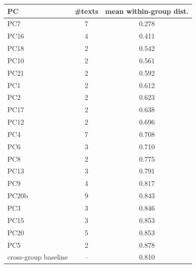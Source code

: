 \begin{tabular}{lcc}
\toprule
PC & \#texts & mean within-group dist. \\
\midrule
PC7 & 7 & 0.278 \\
PC16 & 4 & 0.411 \\
PC18 & 2 & 0.542 \\
PC10 & 2 & 0.561 \\
PC21 & 2 & 0.592 \\
PC1 & 2 & 0.612 \\
PC2 & 2 & 0.623 \\
PC17 & 2 & 0.638 \\
PC12 & 2 & 0.696 \\
PC4 & 7 & 0.708 \\
PC6 & 3 & 0.710 \\
PC8 & 2 & 0.775 \\
PC13 & 3 & 0.791 \\
PC9 & 4 & 0.817 \\
PC20b & 9 & 0.843 \\
PC3 & 3 & 0.846 \\
PC15 & 3 & 0.853 \\
PC20 & 5 & 0.853 \\
PC5 & 2 & 0.878 \\
\midrule
cross-group baseline & -- & 0.810 \\
\bottomrule
\end{tabular}
